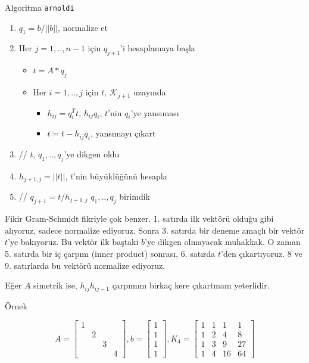\documentclass[12pt,fleqn]{article}\usepackage{../../common}
\begin{document}
Algoritma \verb!arnoldi!
\begin{enumerate}
  \item $q_1 = b / ||b||$, normalize et
  \item  Her $j = 1,..,n-1$ için $q_{j+1}$'i hesaplamaya başla
  \begin{itemize}
     \item $t = A * q_j$
     \item Her $i = 1,..,j $ için $t$, $\mathscr{K}_{j+1}$ uzayında
     \begin{itemize}
       \item $h_{ij} = q_i^T t$,  $h_{ij}q_i$, $t$'nin $q_i$'ye yansıması
       \item $t = t - h_{ij}q_i$, yansımayı çıkart
     \end{itemize}
  \end{itemize}
  \item // $t$, $q_1,..,q_j$'ye dikgen oldu
  \item $h_{j+1,j} = ||t||$, $t$'nin büyüklüğünü hesapla
  \item // $q_{j+1} = t / h_{j+1,j}$
  $q_1,..,q_j$ birimdik
\end{enumerate}

Fikir Gram-Schmidt fikriyle çok benzer. 1. satırda ilk vektörü olduğu gibi
alıyoruz, sadece normalize ediyoruz. Sonra 3. satırda bir deneme
amaçlı bir vektör $t$'ye  bakıyoruz. Bu vektör ilk baştaki $b$'ye dikgen
olmayacak muhakkak. O zaman 5. satırda bir iç çarpım (inner product)
sonrası, 6. satırda $t$'den çıkartıyoruz. 8 ve 9. satırlarda bu
vektörü normalize ediyoruz. 

Eğer $A$ simetrik ise, $h_{ij}h_{ij-1}$ çarpımını birkaç kere çıkartmam
yeterlidir. 

Örnek 

$$  
A = 
\left[\begin{array}{rrrr}
1 &&& \\
 & 2 && \\
 && 3 & \\
 &&& 4 
\end{array}\right],
b = 
\left[\begin{array}{r}
1 \\ 1\\ 1 \\ 1
\end{array}\right]
,
K_4 = 
\left[\begin{array}{rrrr}
1 & 1 & 1 & 1\\
1 & 2 & 4 & 8\\
1 & 3 & 9 & 27\\
1 & 4 & 16 & 64 
\end{array}\right]
$$
\end{document}

